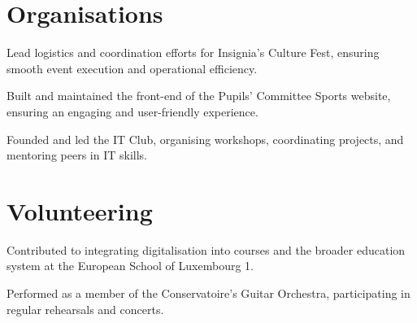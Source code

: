 \section{Organisations}

\begin{bullets}
    \item Lead logistics and coordination efforts for Insignia's Culture Fest, ensuring smooth event execution and operational efficiency.
\end{bullets}

\begin{bullets}
    \item Built and maintained the front-end of the Pupils' Committee Sports website, ensuring an engaging and user-friendly experience.
\end{bullets}

\begin{bullets}
    \item Founded and led the IT Club, organising workshops, coordinating projects, and mentoring peers in IT skills.
\end{bullets}

\section{Volunteering}

\begin{bullets}
    \item Contributed to integrating digitalisation into courses and the broader education system at the European School of Luxembourg 1.
\end{bullets}

\begin{bullets}
    \item Performed as a member of the Conservatoire's Guitar Orchestra, participating in regular rehearsals and concerts.
\end{bullets}

